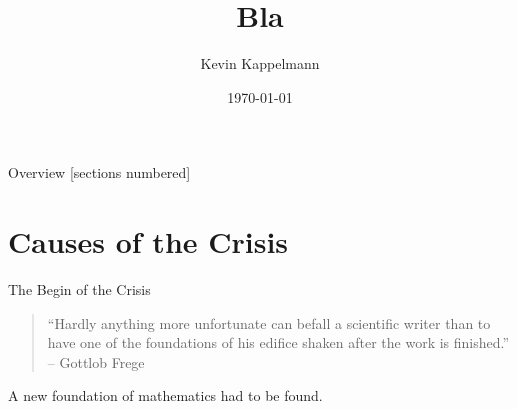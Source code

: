 \documentclass{beamer}
\title{Bla} %
\author{Kevin Kappelmann} %
\institute[VU Amsterdam]{Vrije Universiteit Amsterdam}
\date{\today} %
\begin{document}
\maketitle

\begin{frame}{Overview}
	[sections numbered]
	\tableofcontents
\end{frame}

\section{Causes of the Crisis}
\begin{frame}{The Begin of the Crisis}
\begin{quote}
	``Hardly anything more unfortunate can befall a scientific writer than to have one of the foundations of his edifice shaken after the work is finished.''\nocite{frege_appendix}\\\hfill-- Gottlob Frege
\end{quote}
	\pause
	\centerline{\alert{A new foundation of mathematics had to be found.}}
\end{frame}
\end{document}
